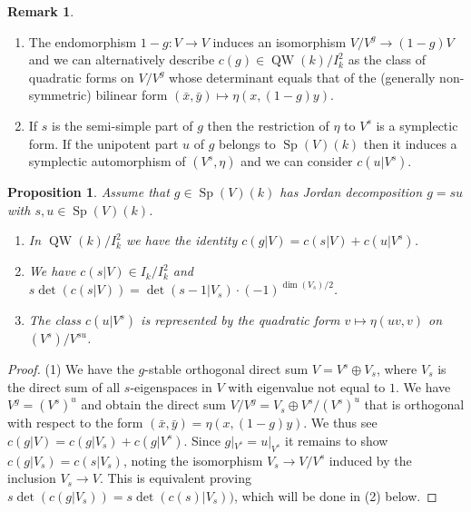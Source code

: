 \documentclass{article}
\DeclareMathOperator{\Sp}{Sp}
\newtheorem{pro}[thm]{Proposition}
\theoremstyle{definition}
\newtheorem{rem}[thm]{Remark}
\numberwithin{equation}{subsection}
\renewcommand{\-}{\hyp{}}
\DeclareMathOperator{\QW}{QW}
\begin{document}
\begin{appendices}
\begin{rem}
	\begin{enumerate}
		\item The endomorphism $1-g : V \to V$ induces an isomorphism $V/V^g \to (1-g)V$ and we can alternatively describe $c(g) \in \QW(k)/I_k^2$ as the class of quadratic forms on $V/V^g$ whose determinant equals that of the (generally non-symmetric) bilinear form $(\bar x,\bar y) \mapsto \eta(x,(1-g)y)$.
		\item If $s$ is the semi-simple part of $g$ then the restriction of $\eta$ to $V^s$ is a symplectic form. If the unipotent part $u$ of $g$ belongs to $\Sp(V)(k)$ then it induces a symplectic automorphism of $(V^s,\eta)$ and we can consider $c(u|V^s)$.
	\end{enumerate}
\end{rem}


\begin{pro} \label{pro:metasection}
	Assume that $g \in \Sp(V)(k)$ has Jordan decomposition $g=su$ with $s,u \in \Sp(V)(k)$. 
	\begin{enumerate}
		\item In $\QW(k)/I_k^2$ we have the identity $c(g|V) = c(s|V) + c(u|V^s)$.
		\item We have $c(s|V) \in I_k/I_k^2$ and $s\det(c(s|V))=\det(s-1|V_s)\cdot (-1)^{\dim(V_s)/2}$.
		\item The class $c(u|V^s)$ is represented by the quadratic form $v \mapsto \eta(uv,v)$ on $(V^s)/V^{su}$.
	\end{enumerate}
\end{pro}
\begin{proof}
	(1) We have the $g$-stable orthogonal direct sum $V=V^s \oplus V_s$, where $V_s$ is the direct sum of all $s$-eigenspaces in $V$ with eigenvalue not equal to $1$. We have $V^g=(V^s)^u$ and obtain the direct sum $V/V^g = V_s \oplus V^s/(V^s)^u$ that is orthogonal with respect to the form $(\bar x,\bar y)=\eta(x,(1-g)y)$. We thus see $c(g|V)=c(g|V_s)+c(g|V^s)$. Since $g|_{V^s}=u|_{V^s}$ it remains to show $c(g|V_s)=c(s|V_s)$, noting the isomorphism $V_s \to V/V^s$ induced by the inclusion $V_s \to V$. This is equivalent proving $s\det(c(g|V_s))=s\det(c(s)|V_s))$, which will be done in (2) below.


\end{proof}
\end{appendices}
\end{document}
